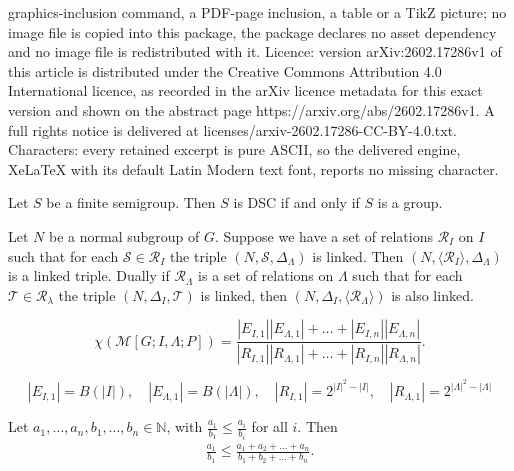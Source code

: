 \documentclass[10pt,a4paper]{amsart}
\newcommand{\N}{\mathbb{N}}
\newcommand{\RM}{\mathcal{M}[G;I,\Lambda;P]}
\begin{document}
graphics-inclusion command, a PDF-page inclusion, a table or a TikZ picture; no image file is copied into this package, the package declares no asset dependency and no image file is redistributed with it. Licence: version arXiv:2602.17286v1 of this article is distributed under the Creative Commons Attribution 4.0 International licence, as recorded in the arXiv licence metadata for this exact version and shown on the abstract page https://arxiv.org/abs/2602.17286v1. A full rights notice is delivered at licenses/arxiv-2602.17286-CC-BY-4.0.txt. Characters: every retained excerpt is pure ASCII, so the delivered engine, XeLaTeX with its default Latin Modern text font, reports no missing character.
\begin{thm}
    \label{motivation theorem}
    Let $S$ be a finite semigroup. Then $S$ is DSC  if and only if $S$ is a group.
\end{thm}

\begin{lemma}
    \label{gen implies linked}
    Let $N$ be a normal subgroup of $G$.
    Suppose we have a set of relations $\mathcal{R}_I$ on $I$ such that for each $\mathcal{S} \in \mathcal{R}_I$ the triple $(N,\mathcal{S},\Delta_\Lambda)$ is linked.
    Then $(N,\langle \mathcal{R}_I \rangle,\Delta_\Lambda) $ is a linked triple.
    Dually if $\mathcal{R}_\Lambda$ is a set of relations on $\Lambda$ such that for each $\mathcal{T} \in \mathcal{R}_\lambda$ the triple $(N,\Delta_I,\mathcal{T})$ is linked, then $(N,\Delta_I,\langle \mathcal{R}_\Lambda\rangle)$ is also linked.
\end{lemma}

\begin{equation}
    \label{DSC coef form for Rees matrix}
    \chi(\RM) = \frac{|E_{I,1}||E_{\Lambda ,1}| + \dots + |E_{I,n}||E_{\Lambda,n}|}{|R_{I,1}||R_{\Lambda ,1}| + \dots +|R_{I,n}||R_{\Lambda,n}|}.
\end{equation}

\begin{equation}
    \label{N = G case}
    |E_{I,1}| = B(|I|) ,\quad |E_{\Lambda,1}| = B(|\Lambda|),\quad |R_{I,1}| = 2^{|I|^2 - |I|}, \quad|R_{\Lambda,1}| = 2^{|\Lambda|^2 - |\Lambda|}
\end{equation}

\begin{lemma}
    \label{elementary fraction result}
    Let $a_1 , \dots , a_n , b_1 , \dots , b_n \in \N$, with $\frac{a_1}{b_1} \leq \frac{a_i}{b_i}$ for all $i$.
    Then
    \begin{align*}
        \frac{a_1}{b_1} \leq \frac{a_1 + a_2 + \dots + a_n}{b_1 + b_2 + \dots + b_n}. \tag*{\qed}
    \end{align*}
\end{lemma}
\end{document}
